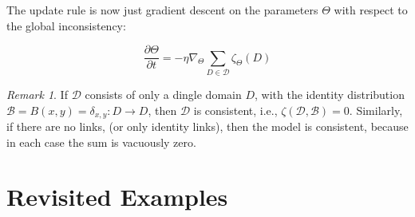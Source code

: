 \documentclass{article}
\theoremstyle{plain}
\theoremstyle{definition}
\theoremstyle{remark}
\newtheorem*{remark}{Remark}
\begin{document}
 	The update rule is now just gradient descent on the parameters $\Theta$ with respect to the global inconsistency:
 	
 	\[ \frac{\partial \Theta}{\partial t} = - \eta \nabla_\Theta \sum_{D \in \mathcal D} \zeta_\Theta(D) \]
 	
 	
 	\begin{remark}
 		If $\mathcal D$ consists of only a dingle domain $D$, with the identity distribution $\mathcal B = {B(x,y) = \delta_{x,y}: D \to D}$, then $\mathcal D$ is consistent, i.e., $\zeta(\mathcal D, \mathcal B) = 0$. Similarly, if there are no links, (or only identity links), then the model is consistent, because in each case the sum is vacuously zero. 
 	\end{remark}
 	

	
		
	\section{Revisited Examples}
	
	
	
	
\end{document}
